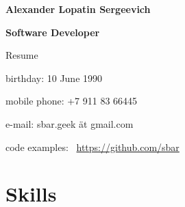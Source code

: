 \begin{center}
\fontsize{16pt}{12pt}\selectfont
\bfseries Alexander Lopatin Sergeevich\mdseries

\fontsize{12pt}{12pt}\selectfont
\bfseries Software Developer\mdseries

Resume
\end{center}
{
\fontsize{10pt}{8pt}\selectfont
\begin{center}
\item birthday: 10 June 1990
\item mobile phone: +7 911 83 66445
\item e-mail: sbar.geek ät gmail.com
\item code examples: \
\href{https://github.com/sbar?tab=repositories}{https://github.com/sbar}
\end{center}
}


\fontsize{11pt}{12pt}\selectfont

\section{Skills}

